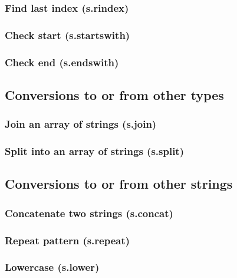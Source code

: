 \documentclass{article}
\theoremstyle{definition}
\begin{document}
\subsubsection{Find last index (s.rindex)}

\subsubsection{Check start (s.startswith)}

\subsubsection{Check end (s.endswith)}

\subsection{Conversions to or from other types}

\subsubsection{Join an array of strings (s.join)}

\subsubsection{Split into an array of strings (s.split)}

\subsection{Conversions to or from other strings}

\subsubsection{Concatenate two strings (s.concat)}

\subsubsection{Repeat pattern (s.repeat)}

\subsubsection{Lowercase (s.lower)}
\end{document}
